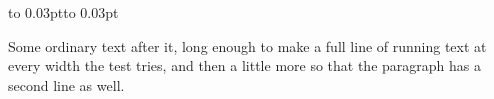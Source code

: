 \documentclass{article}
\begin{document}
\vbox to 0.03pt{}\vbox to 0.03pt{}\vbox{}
\vskip -36.135pt
\vskip 10.84pt
\par
Some ordinary text after it, long enough to make a full line of running
text at every width the test tries, and then a little more so that the
paragraph has a second line as well.
\end{document}
